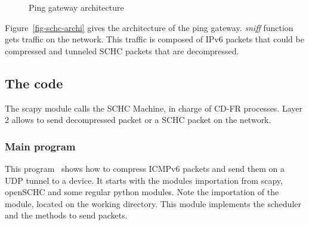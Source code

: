 \begin{figure}[!ht] 
\centering 



\caption{Ping gateway architecture} 
\label{fig-schc-archi} 
\end{figure} 

Figure~\vref{fig-schc-archi} gives the architecture of the ping gateway. 
 \textit{sniff} function gets traffic on the network. 
This traffic is composed of IPv6 packets that could be compressed and tunneled SCHC packets that are decompressed. 



\subsection{The code}
\label{sec-compr_code}


The scapy module calls the SCHC Machine, in charge of CD-FR processes. Layer 2 allows to send decompressed packet or a SCHC packet on the network. 

\subsubsection{Main program}



This program~ shows how to compress ICMPv6 packets and send them on a UDP tunnel to a device. It starts with the modules importation from scapy, openSCHC and some regular python modules. Note the importation of the  module, located on the working directory. This module implements the scheduler and the methods to send packets.


